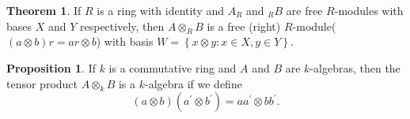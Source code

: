 \documentclass[a4paper,12pt]{article}
\newcommand{\bbrace}[1]{\left\{ #1 \right\} }
\theoremstyle{definition}
\newtheorem{theo}[defn]{Theorem}
\newtheorem{prop}[defn]{Proposition}
\begin{document}
\begin{theo}
    If $R$ is a ring with identity and $A_R$ and $_RB$ are free $R$-modules with bases $X$ and $Y$ respectively, then $A \otimes_R B$ is a free (right) $R$-module($(a\otimes b)r=ar\otimes b$) with basis $W=\bbrace{x \otimes y: x\in X, y\in Y}$.
    \label{tensor product preserve free module}
\end{theo}
\begin{prop}
    If $k$ is a commutative ring and $A$ and $B$ are $k$-algebras, then the tensor product $A \otimes_k B$ is a $k$-algebra if we define
    $$
        (a \otimes b)\left(a^{\prime} \otimes b^{\prime}\right)=a a^{\prime} \otimes b b^{\prime} .
    $$
\end{prop}
\end{document}
